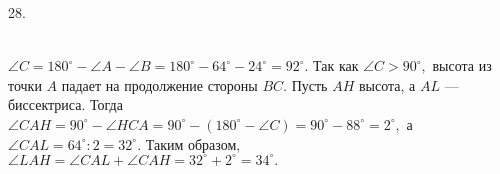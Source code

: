 28. \begin{figure}[ht!]
\end{figure}\\
$\angle C=180^\circ-\angle A-\angle B=180^\circ-64^\circ-24^\circ=92^\circ.$ Так как $\angle C>90^\circ,$ высота из точки $A$ падает на продолжение стороны $BC.$   Пусть $AH$ высота, а $AL$ --- биссектриса. Тогда $\angle CAH=90^\circ-\angle HCA=90^\circ-(180^\circ-\angle C)=90^\circ-88^\circ=2^\circ,$ а $\angle CAL=64^\circ:2=32^\circ.$ Таким образом, $\angle LAH=\angle CAL+ \angle CAH=32^\circ+2^\circ=34^\circ.$\newpage\noindent
